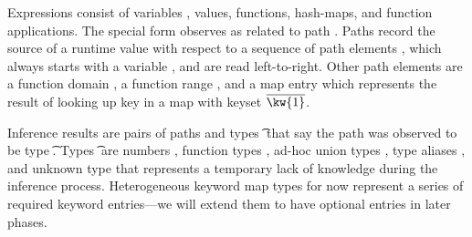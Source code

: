 Expressions \e{} consist of variables \x{}, values,
functions, hash-maps, and function applications.
The special form
\trackE{\e{}}{\inferpath{}}
observes {\e{}} as related to path {\inferpath{}}.
Paths \inferpath{} 
record the source of a runtime value with respect
to a sequence of path elements \inferpth{}, which always starts with
a variable \x{}, and are read left-to-right.
Other path elements are
a function domain \dompe{}, 
a function range \rngpe{},
and a map entry {}
which represents the result of looking up key {}
in a map with keyset ${\ova{\kw{1}}}$.

Inference results \restwoarrow{\inferpath{}}{\t{}}
are pairs of paths {\inferpath{}} and types \t{}
that say the path \inferpath{} was observed to be 
type \t{}.
Types \t{} are numbers \IntT{}, function types \arrow{\t{}}{\t{}},
ad-hoc union types \Union{\t{}}{\t{}},
type aliases \alias{},
and unknown type \UnknownT{} that represents
a temporary lack of knowledge during the inference process.
Heterogeneous keyword map types \HMappretty{\ova{\kw{}\ \t{}}}
for now represent a series of required keyword entries---we will extend
them to have optional entries in later phases.

